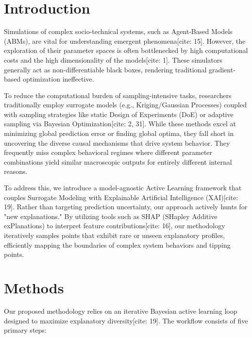\documentclass[sn-mathphys]{sn-jnl}
\theoremstyle{thmstyleone}%
\theoremstyle{thmstyletwo}%
\theoremstyle{thmstylethree}%
\begin{document}
\tableofcontents

\section{Introduction}
Simulations of complex socio-technical systems, such as Agent-Based Models (ABMs), are vital for understanding emergent phenomena[cite: 15]. However, the exploration of their parameter spaces is often bottlenecked by high computational costs and the high dimensionality of the models[cite: 1]. These simulators generally act as non-differentiable black boxes, rendering traditional gradient-based optimization ineffective. 

To reduce the computational burden of sampling-intensive tasks, researchers traditionally employ surrogate models (e.g., Kriging/Gaussian Processes) coupled with sampling strategies like static Design of Experiments (DoE) or adaptive sampling via Bayesian Optimization[cite: 2, 31]. While these methods excel at minimizing global prediction error or finding global optima, they fall short in uncovering the diverse causal mechanisms that drive system behavior. They frequently miss complex behavioral regimes where different parameter combinations yield similar macroscopic outputs for entirely different internal reasons.

To address this, we introduce a model-agnostic Active Learning framework that couples Surrogate Modeling with Explainable Artificial Intelligence (XAI)[cite: 19]. Rather than targeting prediction uncertainty, our approach actively hunts for "new explanations." By utilizing tools such as SHAP (SHapley Additive exPlanations) to interpret feature contributions[cite: 16], our methodology iteratively samples points that exhibit rare or unseen explanatory profiles, efficiently mapping the boundaries of complex system behaviors and tipping points.

\section{Methods}
Our proposed methodology relies on an iterative Bayesian active learning loop designed to maximize explanatory diversity[cite: 19]. The workflow consists of five primary steps:
\end{document}
